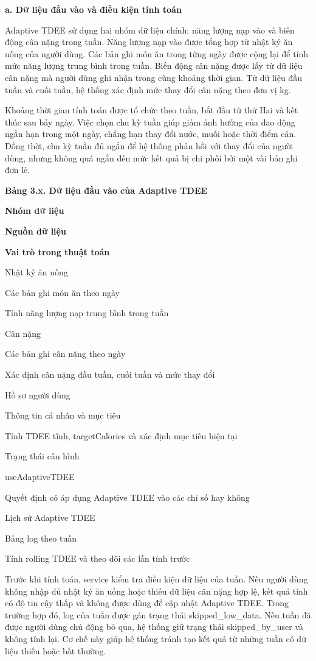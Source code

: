 \documentclass[12pt, a4paper]{report}
\begin{document}
\textbf{a. Dữ liệu đầu vào và điều kiện tính toán}

Adaptive TDEE sử dụng hai nhóm dữ liệu chính: năng lượng nạp vào và biến động cân nặng trong tuần. Năng lượng nạp vào được tổng hợp từ nhật ký ăn uống của người dùng. Các bản ghi món ăn trong từng ngày được cộng lại để tính mức năng lượng trung bình trong tuần. Biến động cân nặng được lấy từ dữ liệu cân nặng mà người dùng ghi nhận trong cùng khoảng thời gian. Từ dữ liệu đầu tuần và cuối tuần, hệ thống xác định mức thay đổi cân nặng theo đơn vị kg.

Khoảng thời gian tính toán được tổ chức theo tuần, bắt đầu từ thứ Hai và kết thúc sau bảy ngày. Việc chọn chu kỳ tuần giúp giảm ảnh hưởng của dao động ngắn hạn trong một ngày, chẳng hạn thay đổi nước, muối hoặc thời điểm cân. Đồng thời, chu kỳ tuần đủ ngắn để hệ thống phản hồi với thay đổi của người dùng, nhưng không quá ngắn đến mức kết quả bị chi phối bởi một vài bản ghi đơn lẻ.

\textbf{Bảng 3.x. Dữ liệu đầu vào của Adaptive TDEE}

\textbf{Nhóm dữ liệu}

\textbf{Nguồn dữ liệu}

\textbf{Vai trò trong thuật toán}

Nhật ký ăn uống

Các bản ghi món ăn theo ngày

Tính năng lượng nạp trung bình trong tuần

Cân nặng

Các bản ghi cân nặng theo ngày

Xác định cân nặng đầu tuần, cuối tuần và mức thay đổi

Hồ sơ người dùng

Thông tin cá nhân và mục tiêu

Tính TDEE tĩnh, targetCalories và xác định mục tiêu hiện tại

Trạng thái cấu hình

useAdaptiveTDEE

Quyết định có áp dụng Adaptive TDEE vào các chỉ số hay không

Lịch sử Adaptive TDEE

Bảng log theo tuần

Tính rolling TDEE và theo dõi các lần tính trước

Trước khi tính toán, service kiểm tra điều kiện dữ liệu của tuần. Nếu người dùng không nhập đủ nhật ký ăn uống hoặc thiếu dữ liệu cân nặng hợp lệ, kết quả tính có độ tin cậy thấp và không được dùng để cập nhật Adaptive TDEE. Trong trường hợp đó, log của tuần được gán trạng thái skipped\_low\_data. Nếu tuần đã được người dùng chủ động bỏ qua, hệ thống giữ trạng thái skipped\_by\_user và không tính lại. Cơ chế này giúp hệ thống tránh tạo kết quả từ những tuần có dữ liệu thiếu hoặc bất thường.
\end{document}
